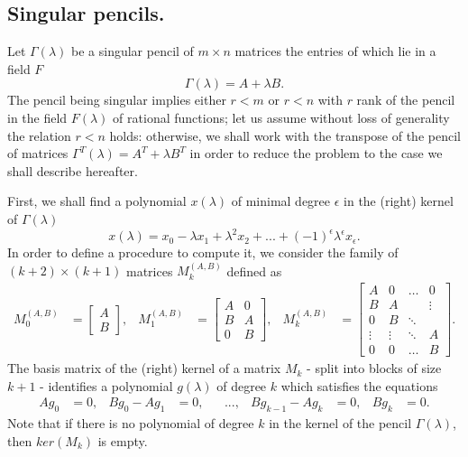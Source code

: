 \subsection*{Singular pencils.}

Let \(\Gamma(\lambda)\) be a singular pencil of \(m \times n\) matrices the entries of which lie in a field \(F\)
\[\Gamma(\lambda) = A + \lambda B.\]
The pencil being singular implies either \(r < m\) or \(r < n\) with \(r\) rank of the pencil in the field \(F(\lambda)\)
of rational functions; let us assume without loss of generality the
relation \(r < n\) holds: otherwise, we shall work with the transpose of the pencil of matrices
\(\Gamma^{T}(\lambda) = A^T + \lambda B^T\) in order to reduce the problem to the case we shall describe hereafter.

First, we shall find a polynomial \(x(\lambda)\) of minimal degree \(\epsilon\) in the (right) kernel
of \(\Gamma(\lambda)\)
\[
    x(\lambda) = x_{0} - \lambda x_{1} + \lambda^2 x_{2} + ... + (-1)^\epsilon \lambda^\epsilon x_{\epsilon}.
\]
In order to define a procedure to compute it, we consider the family of \((k+2) \times (k+1)\) matrices
\(M_{k}^{(A, B)}\) defined as
\begin{align*}
    M_{0}^{(A, B)} &=
        \begin{bmatrix}
            A \\
            B
        \end{bmatrix},
    & M_{1}^{(A, B)} &=
        \begin{bmatrix}
            A & 0 \\
            B & A \\
            0 & B
        \end{bmatrix},
    & M_{k}^{(A, B)} &=
        \begin{bmatrix}
            A & 0 & \hdots &    0   \\
            B & A &        & \vdots \\
            0 & B & \ddots & \\
            \vdots & \vdots & \ddots & A \\
            0      &    0   & \hdots & B
        \end{bmatrix}.
\end{align*}
The basis matrix of the (right) kernel of a matrix \(M_{k}\) - split into blocks of size \(k+1\) - identifies
a polynomial \(g(\lambda)\) of degree \(k\) which satisfies the equations
\begin{align*}
   Ag_{0} &= 0, &
   Bg_{0} - Ag_{1} &= 0, &
   & ..., &
   Bg_{k-1} - Ag_{k} &= 0, &
   Bg_{k} &= 0.
\end{align*}
Note that if there is no polynomial of degree \(k\) in the kernel of the pencil
\(\Gamma(\lambda)\), then \(ker(M_{k})\) is empty.

